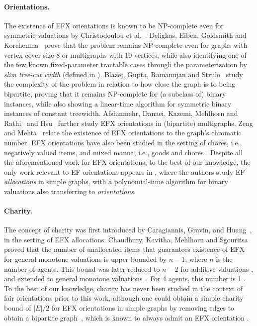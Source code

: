 \paragraph{Orientations.}
The existence of EFX orientations is known to be NP-complete even for symmetric valuations by Christodoulou et al.~\cite{EFXgraphs}.
Deligkas, Eiben, Goldsmith and Korchemna~\cite{ijcai/DeligkasEGK25} prove that the problem remains NP-complete even for graphs with vertex cover size $8$ or multigraphs with $10$ vertices, while also identifying one of the few known fixed-parameter tractable cases through the parameterization by \emph{slim tree-cut width} (defined in \cite{algorithmica/GanianK24}).
Blazej, Gupta, Ramanujan and Strulo~\cite{sagt/BlazejGRS25} study the complexity of the problem in relation to how close the graph is to being bipartite,
proving that it remains NP-complete for (a subclass of) binary instances,
while also showing a linear-time algorithm for symmetric binary instances of constant treewidth.
Afshinmehr, Danaei, Kazemi, Mehlhorn and Rathi~\cite{AfshinmehrDKMR25} and Hsu~\cite{ecai/Hsu25} further study EFX orientations in (bipartite) multigraphs. %
Zeng and Mehta~\cite{ifaamas/ZengM25} relate the existence of EFX orientations to the graph's chromatic number.
EFX orientations have also been studied in the setting of chores, i.e., negatively valued items, and mixed manna, i.e., goods and chores \cite{hsu2025polynomialtimealgorithmefxorientationsChores,ijcai/ZWL024}.
Despite all the aforementioned work for EFX orientations, to the best of our knowledge,
the only work relevant to EF orientations appears in \cite{aldt/MisraS24},
where the authors study EF \emph{allocations} in simple graphs,
with a polynomial-time algorithm for binary valuations also transferring to \emph{orientations}.



\paragraph{Charity.}
The concept of charity was first introduced by Caragiannis, Gravin, and Huang~\cite{CGH19}, in the setting of EFX allocations.
Chaudhury, Kavitha, Mehlhorn and Sgouritsa~\cite{CKMS21} proved that the number of unallocated items that guarantees existence of EFX for general monotone valuations is upper bounded by $n-1$, where $n$ is the number of agents. This bound was later reduced to $n-2$ for additive valuations \cite{AlmostFullEFXforFourAgents}, and extended to general monotone valuations~\cite{mahara2021extensionadditivevaluationsgeneral}. For 4 agents, this number is 1 \cite{AlmostFullEFXforFourAgents}.
To the best of our knowledge, charity has never been studied in the context of fair orientations prior to this work, although one could obtain a simple charity bound of $|E|/2$ for EFX orientations in simple graphs by removing edges to obtain a bipartite graph~\cite{erd/Erdos65},
which is known to always admit an EFX orientation \cite{ifaamas/ZengM25}.


